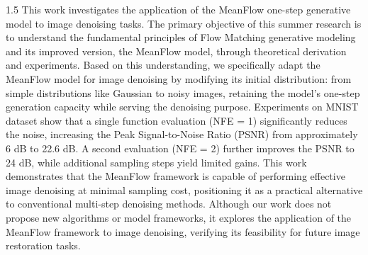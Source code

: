 
\begin{spacing}{1.5}
  This work investigates the application of the MeanFlow one-step generative model to image denoising tasks. The primary objective of this summer research is to understand the fundamental principles of Flow Matching generative modeling and its improved version, the MeanFlow model, through theoretical derivation and experiments. Based on this understanding, we specifically adapt the MeanFlow model for image denoising by modifying its initial distribution: from simple distributions like Gaussian to noisy images, retaining the model’s one-step generation capacity while serving the denoising purpose. Experiments on MNIST dataset show that a single function evaluation (NFE = 1) significantly reduces the noise, increasing the Peak Signal-to-Noise Ratio (PSNR) from approximately 6 dB to 22.6 dB. A second evaluation (NFE = 2) further improves the PSNR to 24 dB, while additional sampling steps yield limited gains. This work demonstrates that the MeanFlow framework is capable of performing effective image denoising at minimal sampling cost, positioning it as a practical alternative to conventional multi-step denoising methods. Although our work does not propose new algorithms or model frameworks, it explores the application of the MeanFlow framework to image denoising, verifying its feasibility for future image restoration tasks.
\end{spacing}

\clearpage
